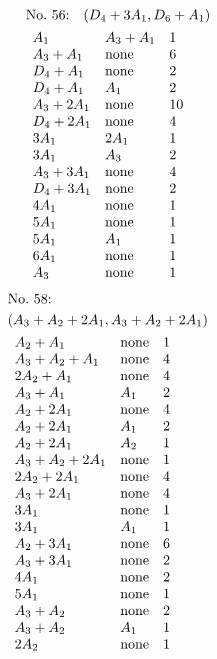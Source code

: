 \begin{align*}
&\hbox to 4cm {\textrm{No.~56:}\quad$(D_{4}+3A_{1}, D_{6}+A_{1})$\hss}\\ 
&\begin{array}{lll}
A_{1} & A_{3}+A_{1} & 1\\
A_{3}+A_{1} & \none & 6\\
D_{4}+A_{1} & \none & 2\\
D_{4}+A_{1} & A_{1} & 2\\
A_{3}+2A_{1} & \none & 10\\
D_{4}+2A_{1} & \none & 4\\
3A_{1} & 2A_{1} & 1\\
3A_{1} & A_{3} & 2\\
A_{3}+3A_{1} & \none & 4\\
D_{4}+3A_{1} & \none & 2\\
4A_{1} & \none & 1\\
5A_{1} & \none & 1\\
5A_{1} & A_{1} & 1\\
6A_{1} & \none & 1\\
A_{3} & \none & 1\\
\end{array}
\end{align*}
%
%
\begin{align*}
&\hbox to 4cm {\textrm{No.~58:}\quad\hss}\\ 
&(A_{3}+A_{2}+2A_{1}, A_{3}+A_{2}+2A_{1})\\ 
&\begin{array}{lll}
A_{2}+A_{1} & \none & 1\\
A_{3}+A_{2}+A_{1} & \none & 4\\
2A_{2}+A_{1} & \none & 4\\
A_{3}+A_{1} & A_{1} & 2\\
A_{2}+2A_{1} & \none & 4\\
A_{2}+2A_{1} & A_{1} & 2\\
A_{2}+2A_{1} & A_{2} & 1\\
A_{3}+A_{2}+2A_{1} & \none & 1\\
2A_{2}+2A_{1} & \none & 4\\
A_{3}+2A_{1} & \none & 4\\
3A_{1} & \none & 1\\
3A_{1} & A_{1} & 1\\
A_{2}+3A_{1} & \none & 6\\
A_{3}+3A_{1} & \none & 2\\
4A_{1} & \none & 2\\
5A_{1} & \none & 1\\
A_{3}+A_{2} & \none & 2\\
A_{3}+A_{2} & A_{1} & 1\\
2A_{2} & \none & 1\\
\end{array}
\end{align*}
